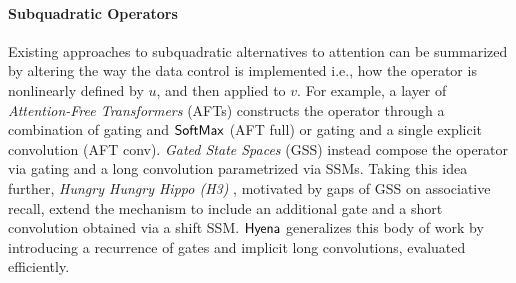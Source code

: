 \paragraph{Subquadratic Operators}
%
Existing approaches to subquadratic alternatives to attention can be summarized by altering the way the data control is implemented i.e., how the operator is nonlinearly defined by $u$, and then applied to $v$. For example, a layer of \textit{Attention-Free Transformers} (AFTs) \citep{zhai2021attention} constructs the operator through a combination of gating and {$\sf SoftMax$} (AFT full) or gating and a single explicit convolution (AFT conv). \textit{Gated State Spaces} (GSS) instead compose the operator via gating and a long convolution parametrized via SSMs. Taking this idea further, \textit{Hungry Hungry Hippo (H3)} \citep{dao2022hungry}, motivated by gaps of GSS on associative recall, extend the mechanism to include an additional gate and a short convolution obtained via a shift SSM. ${\sf Hyena}$ generalizes this body of work by introducing a recurrence of gates and implicit long convolutions, evaluated efficiently.